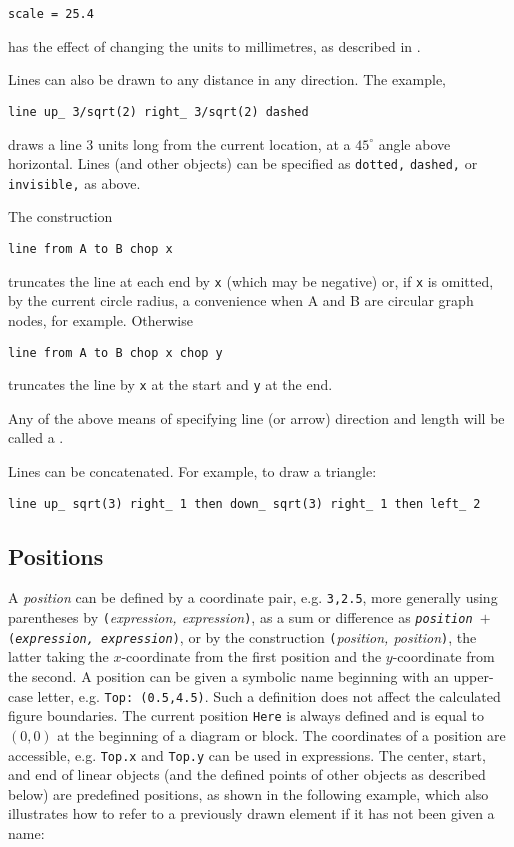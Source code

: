 {\tt scale = 25.4}

\noindent
has the effect of changing the units to millimetres,
as described in .

Lines can also be drawn to any distance in any direction.  The example,

{\tt line up\_ 3/sqrt(2) right\_ 3/sqrt(2) dashed}

\noindent
draws a line 3 units long from the current location,
at a $45^\circ$ angle above horizontal.
Lines (and other objects) can be specified as {\tt dotted,} {\tt dashed,} or
{\tt invisible,} as above.

The construction

{\tt line from A to B chop x}

\noindent
truncates the line at each end by {\tt x} (which may be negative)
or, if {\tt x} is omitted, by
the current circle radius, a convenience when A and B are
circular graph nodes, for example.  Otherwise

{\tt line from A to B chop x chop y}

\noindent
truncates the line by {\tt x} at the start and {\tt y} at the end.

Any of the above means of specifying line (or arrow) direction and length
will be called a \linespec.

Lines can be concatenated.  For example, to draw a triangle:

{\tt line up\_ sqrt(3) right\_ 1 then down\_ sqrt(3) right\_ 1 then left\_ 2}

\subsection{Positions\label{Positions:}}
A {\sl position} can be defined by a coordinate pair, e.g. {\tt 3,2.5},
more generally using parentheses by {\tt (}{\sl expression, expression}{\tt )},
as a sum or difference as
{\tt{\sl position} $+$ ({\sl expression, expression})},
or by the construction {\tt (}{\sl position, position}{\tt )},
the latter taking the $x$-coordinate from the first
position and the $y$-coordinate from the second.  A position can be
given a symbolic name beginning with an upper-case letter,
e.g. {\tt Top:~(0.5,4.5)}.  Such a definition does not affect the calculated
figure boundaries.  The current position {\tt Here} is always defined and
is equal to $(0,0)$ at the beginning of a diagram or block.
The coordinates of a position are accessible, e.g. {\tt Top.x} and
{\tt Top.y} can be used in expressions.  The center, start, and end of
linear objects (and the defined points of other objects as described below)
are predefined positions, as shown in the following example,
which also illustrates how to refer to a previously drawn element if it has
not been given a name:

